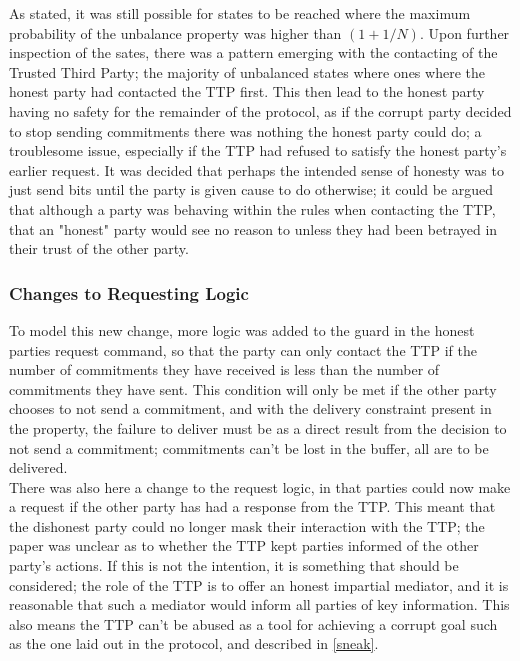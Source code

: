 \documentclass{l4proj}
\begin{document}
As stated, it was still possible for states to be reached where the maximum probability of the unbalance property was higher than $(1+1/ N)$. Upon further inspection of the sates, there was a pattern emerging with the contacting of the Trusted Third Party; the majority of unbalanced states where ones where the honest party had contacted the TTP first. This then lead to the honest party having no safety for the remainder of the protocol, as if the corrupt party decided to stop sending commitments there was nothing the honest party could do; a troublesome issue, especially if the TTP had refused to satisfy the honest party's earlier request. It was decided that perhaps the intended sense of honesty was to just send bits until the party is given cause to do otherwise; it could be argued that although a party was behaving within the rules when contacting the TTP, that an "honest" party would see no reason to unless they had been betrayed in their trust of the other party.

\subsubsection{Changes to Requesting Logic}

To model this new change, more logic was added to the guard in the honest parties request command, so that the party can only contact the TTP if the number of commitments they have received is less than the number of commitments they have sent. This condition will only be met if the other party chooses to not send a commitment, and with the delivery constraint present in the property, the failure to deliver must be as a direct result from the decision to not send a commitment; commitments can't be lost in the buffer, all are to be delivered.\\
There was also here a change to the request logic, in that parties could now make a request if the other party has had a response from the TTP. This meant that the dishonest party could no longer mask their interaction with the TTP; the paper was unclear as to whether the TTP kept parties informed of the other party's actions. If this is not the intention, it is something that should be considered; the role of the TTP is to offer an honest impartial mediator, and it is reasonable that such a mediator would inform all parties of key information. This also means the TTP can't be abused as a tool for achieving a corrupt goal such as the one laid out in the protocol, and described in \ref{sneak}. 
\end{document}
